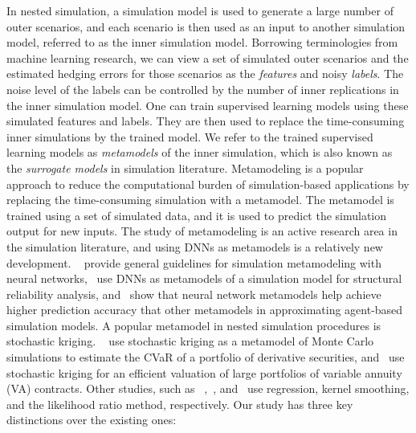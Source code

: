 In nested simulation, a simulation model is used to generate a large number of outer scenarios, and each scenario is then used as an input to another simulation model, referred to as the inner simulation model.
Borrowing terminologies from machine learning research, we can view a set of simulated outer scenarios and the estimated hedging errors for those scenarios as the \textit{features} and noisy \textit{labels}.
The noise level of the labels can be controlled by the number of inner replications in the inner simulation model.
One can train supervised learning models using these simulated features and labels.
They are then used to replace the time-consuming inner simulations by the trained model.
We refer to the trained supervised learning models as \textit{metamodels} of the inner simulation, which is also known as the \textit{surrogate models} in simulation literature.
Metamodeling is a popular approach to reduce the computational burden of simulation-based applications by replacing the time-consuming simulation with a metamodel.
The metamodel is trained using a set of simulated data, and it is used to predict the simulation output for new inputs.
The study of metamodeling is an active research area in the simulation literature, and using DNNs as metamodels is a relatively new development.
~\cite{fonseca2003simulation} provide general guidelines for simulation metamodeling with neural networks,~\cite{lieu2022adaptive} use DNNs as metamodels of a simulation model for structural reliability analysis, and~\cite{salle2014efficient} show that neural network metamodels help achieve higher prediction accuracy that other metamodels in approximating agent-based simulation models.
A popular metamodel in nested simulation procedures is stochastic kriging.
~\cite{liu2010stochastic} use stochastic kriging as a metamodel of Monte Carlo simulations to estimate the CVaR of a portfolio of derivative securities, and~\cite{gan2015valuation} use stochastic kriging for an efficient valuation of large portfolios of variable annuity (VA) contracts.
Other studies, such as ~\cite{broadie2015risk},~\cite{hong2017kernel}, and~\cite{zhang2022sample} use regression, kernel smoothing, and the likelihood ratio method, respectively.
Our study has three key distinctions over the existing ones:
